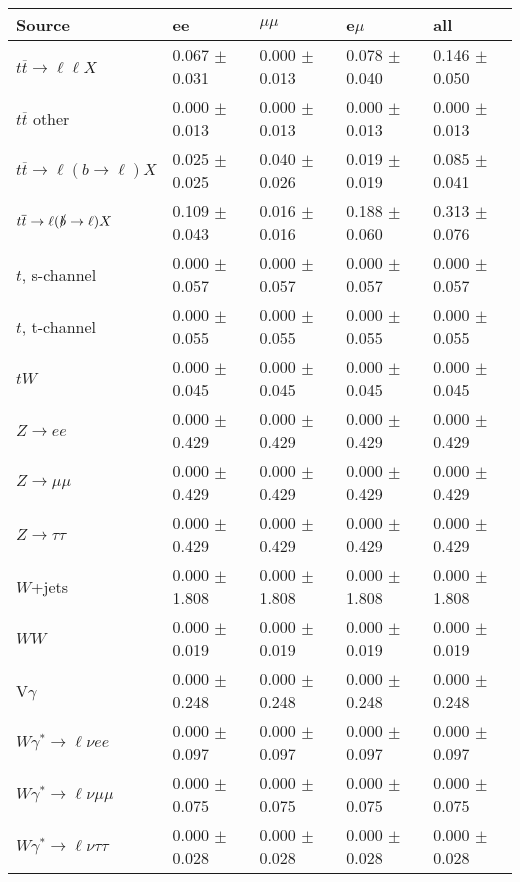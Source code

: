 \begin{tabular}{l | l l l l}
\hline\hline
 Source  &  ee  &  $\mu\mu$  &  e$\mu$  &  all \\
\hline
$t\overline{t}\rightarrow \ell\ell X$ &  0.067 $\pm$  0.031 &  0.000 $\pm$  0.013 &  0.078 $\pm$  0.040 &  0.146 $\pm$  0.050\\
$t\overline{t}$ other &  0.000 $\pm$  0.013 &  0.000 $\pm$  0.013 &  0.000 $\pm$  0.013 &  0.000 $\pm$  0.013\\
$t\overline{t}\rightarrow \ell(b\rightarrow \ell)X$ &  0.025 $\pm$  0.025 &  0.040 $\pm$  0.026 &  0.019 $\pm$  0.019 &  0.085 $\pm$  0.041\\
$t\overline{t}\rightarrow \ell(\slashed{b}\rightarrow \ell)X$ &  0.109 $\pm$  0.043 &  0.016 $\pm$  0.016 &  0.188 $\pm$  0.060 &  0.313 $\pm$  0.076\\
\hline
$t$, s-channel &  0.000 $\pm$  0.057 &  0.000 $\pm$  0.057 &  0.000 $\pm$  0.057 &  0.000 $\pm$  0.057\\
$t$, t-channel &  0.000 $\pm$  0.055 &  0.000 $\pm$  0.055 &  0.000 $\pm$  0.055 &  0.000 $\pm$  0.055\\
$tW$ &  0.000 $\pm$  0.045 &  0.000 $\pm$  0.045 &  0.000 $\pm$  0.045 &  0.000 $\pm$  0.045\\
\hline
$Z\rightarrow ee$ &  0.000 $\pm$  0.429 &  0.000 $\pm$  0.429 &  0.000 $\pm$  0.429 &  0.000 $\pm$  0.429\\
$Z\rightarrow\mu\mu$ &  0.000 $\pm$  0.429 &  0.000 $\pm$  0.429 &  0.000 $\pm$  0.429 &  0.000 $\pm$  0.429\\
$Z\rightarrow\tau\tau$ &  0.000 $\pm$  0.429 &  0.000 $\pm$  0.429 &  0.000 $\pm$  0.429 &  0.000 $\pm$  0.429\\
$W$+jets &  0.000 $\pm$  1.808 &  0.000 $\pm$  1.808 &  0.000 $\pm$  1.808 &  0.000 $\pm$  1.808\\
$WW$ &  0.000 $\pm$  0.019 &  0.000 $\pm$  0.019 &  0.000 $\pm$  0.019 &  0.000 $\pm$  0.019\\
\hline
V$\gamma$ &  0.000 $\pm$  0.248 &  0.000 $\pm$  0.248 &  0.000 $\pm$  0.248 &  0.000 $\pm$  0.248\\
$W\gamma^{*}\rightarrow\ell\nu e e$ &  0.000 $\pm$  0.097 &  0.000 $\pm$  0.097 &  0.000 $\pm$  0.097 &  0.000 $\pm$  0.097\\
$W\gamma^{*}\rightarrow\ell\nu\mu\mu$ &  0.000 $\pm$  0.075 &  0.000 $\pm$  0.075 &  0.000 $\pm$  0.075 &  0.000 $\pm$  0.075\\
$W\gamma^{*}\rightarrow\ell\nu\tau\tau$ &  0.000 $\pm$  0.028 &  0.000 $\pm$  0.028 &  0.000 $\pm$  0.028 &  0.000 $\pm$  0.028\\

\end{tabular}
